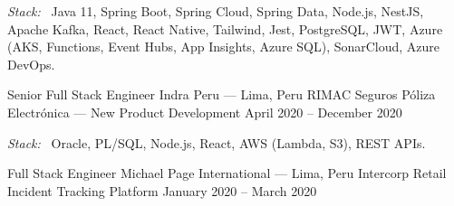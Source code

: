 {\footnotesize\color{cvMuted}\textit{Stack:}~%
Java 11, Spring Boot, Spring Cloud, Spring Data, Node.js, NestJS, Apache Kafka, React,
React Native, Tailwind, Jest, PostgreSQL, JWT, Azure (AKS, Functions, Event Hubs, App Insights,
Azure SQL), SonarCloud, Azure DevOps.}

\vspace{2pt}

\cvEntryClient%
  {Senior Full Stack Engineer}%
  {Indra Peru --- Lima, Peru}%
  {RIMAC Seguros}%
  {Póliza Electrónica --- New Product Development}%
  {April 2020 -- December 2020}

\begin{cvItems}
\end{cvItems}

{\footnotesize\color{cvMuted}\textit{Stack:}~%
Oracle, PL/SQL, Node.js, React, AWS (Lambda, S3), REST APIs.}

\vspace{2pt}

\cvEntryClient%
  {Full Stack Engineer}%
  {Michael Page International --- Lima, Peru}%
  {Intercorp Retail}%
  {Incident Tracking Platform}%
  {January 2020 -- March 2020}

